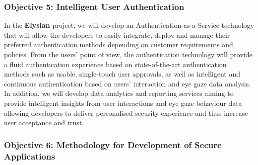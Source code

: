 \documentclass[a4paper,11pt]{article}
\newcommand{\project}[1]{\textbf{#1}\xspace}
\newcommand{\SECURITY}{\project{Elysian}}
\newcommand{\TheProject}{\SECURITY}
\begin{document}
\subsubsection*{Objective 5: Intelligent User Authentication}
\vspace{-6pt}

In the \TheProject{} project, we will develop an Authentication-as-a-Service technology that will allow the developers to easily integrate, deploy and manage their preferred authentication methods depending on customer requirements and policies. From the users’ point of view, the authentication technology will provide a fluid authentication experience based on state-of-the-art authentication methods such as usable, single-touch user approvals, as well as intelligent and continuous authentication based on users' interaction and eye gaze data analysis. In addition, we will develop data analytics and reporting services aiming to provide intelligent insights from user interactions and eye gaze behaviour data allowing developers to deliver personalised security experience and thus increase user acceptance and trust.

\subsubsection*{Objective 6: Methodology for Development of Secure Applications}
\vspace{-6pt}
\end{document}
